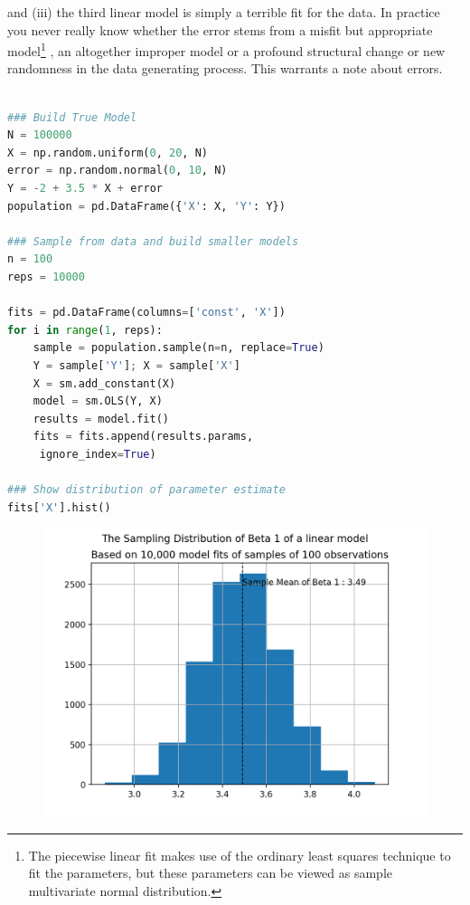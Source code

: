 \documentclass[10pt,a4paper,notitlepage,twocolumn]{article}
\begin{document}
and (iii) the third linear model is simply a terrible fit for the data. In practice you never really know whether the error stems from a misfit but appropriate model\footnote{The piecewise linear fit makes use of the ordinary least squares technique to fit the parameters, but these parameters can be viewed as sample multivariate normal distribution.} , an altogether improper model or a profound structural change or new randomness in the data generating process. 	This warrants a note about errors.
\begin{lstlisting}[language=Python]

### Build True Model
N = 100000
X = np.random.uniform(0, 20, N)
error = np.random.normal(0, 10, N)
Y = -2 + 3.5 * X + error
population = pd.DataFrame({'X': X, 'Y': Y})

### Sample from data and build smaller models
n = 100
reps = 10000

fits = pd.DataFrame(columns=['const', 'X'])
for i in range(1, reps):
    sample = population.sample(n=n, replace=True)
    Y = sample['Y']; X = sample['X']
    X = sm.add_constant(X)
    model = sm.OLS(Y, X)
    results = model.fit()
    fits = fits.append(results.params,
     ignore_index=True)

### Show distribution of parameter estimate
fits['X'].hist()

\end{lstlisting}

\begin{figure}[H]
  \includegraphics[width=\linewidth]{./Plots/distribution_of_beta1.png}
\end{figure}
\end{document}
